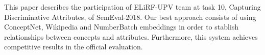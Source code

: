 This paper describes the participation of ELiRF-UPV team at task 10, Capturing Discriminative Attributes, of SemEval-2018. Our best approach consists of using ConceptNet, Wikipedia and NumberBatch embeddings in order to stablish relationships between concepts and attributes. Furthermore, this system achieves competitive results in the official evaluation.
